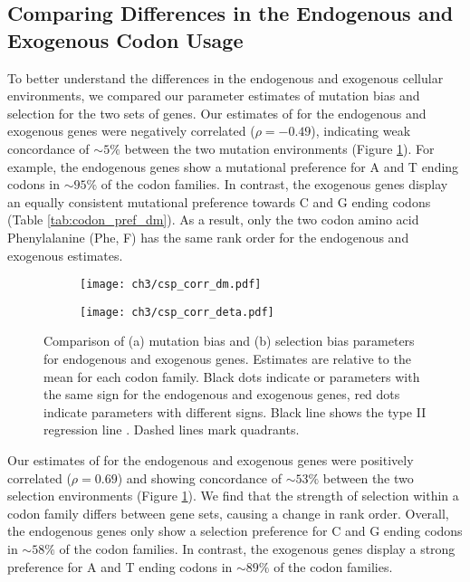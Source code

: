 \subsection{Comparing Differences in the Endogenous and Exogenous Codon Usage}
To better understand the differences in the endogenous and exogenous cellular environments, we compared our parameter estimates of mutation bias \DM and selection \DE for the two sets of genes.
Our estimates of \DM for the endogenous and exogenous genes were negatively correlated ($\rho = -0.49$),  indicating weak concordance of $\sim5\%$ between the two mutation environments (Figure \ref{fig:csp_comp}).
For example, the endogenous genes show a mutational preference for A and T ending codons in $\sim95\%$ of the codon families.
In contrast, the exogenous genes display an equally consistent mutational preference towards C and G ending codons (Table \ref{tab:codon_pref_dm}).
As a result, only the two codon amino acid Phenylalanine (Phe, F) has the same rank order for the endogenous and exogenous \DM estimates.

\begin{figure}
    \centering
    \begin{subfigure}
        \centering
        \texttt{[image: ch3/csp\_corr\_dm.pdf]}
    \end{subfigure}
    \begin{subfigure}
        \centering
        \texttt{[image: ch3/csp\_corr\_deta.pdf]}
    \end{subfigure}
    \caption{Comparison of (a) mutation bias \DM and (b) selection bias \DE parameters for endogenous and exogenous genes.
      Estimates are relative to the mean for each codon family.
      Black dots indicate \DM or \DE parameters with the same sign for the endogenous and exogenous genes, red dots indicate parameters with different signs.
      Black line shows the type II regression line \citep{SokalAndRohlf1981}.
      Dashed lines mark quadrants.}
    \label{fig:csp_comp}
\end{figure}

Our estimates of \DE for the endogenous and exogenous genes were positively correlated ($\rho = 0.69$) and showing concordance of $\sim53\%$ between the two selection environments (Figure \ref{fig:csp_comp}).
We find that the strength of selection within a codon family differs between gene sets, causing a change in rank order.
Overall, the endogenous genes only show a selection preference for C and G ending codons in $\sim58\%$ of the codon families.
In contrast, the exogenous genes display a strong preference for A and T ending codons in $\sim89\%$ of the codon families.


